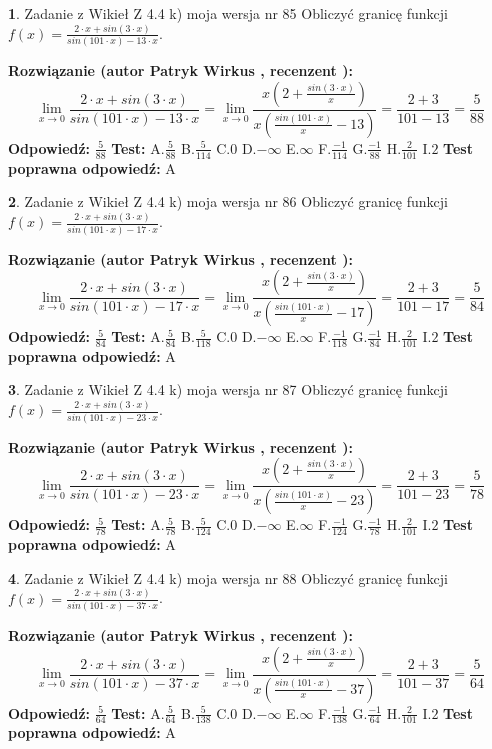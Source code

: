 \documentclass[12pt, a4paper]{article}
\theoremstyle{definition} %
\newtheorem{zad}{}
\newcommand{\zadStart}[1]{\begin{zad}#1\newline}
\newcommand{\zadStop}{\end{zad}}
\newcommand{\rozwStart}[2]{\noindent \textbf{Rozwiązanie (autor #1 , recenzent #2): }\newline}
\newcommand{\rozwStop}{\newline}
\newcommand{\odpStart}{\noindent \textbf{Odpowiedź:}\newline}
\newcommand{\odpStop}{\newline}
\newcommand{\testStart}{\noindent \textbf{Test:}\newline}
\newcommand{\testStop}{\newline}
\newcommand{\kluczStart}{\noindent \textbf{Test poprawna odpowiedź:}\newline}
\newcommand{\kluczStop}{\newline}
\begin{document}
\zadStart{Zadanie z Wikieł Z 4.4 k) moja wersja nr 85}
Obliczyć granicę funkcji $f(x)=\frac{2\cdot x +sin(3\cdot x)}{sin(101\cdot x) -13\cdot x}$.
\zadStop
\rozwStart{Patryk Wirkus}{}
$$\lim\limits_{x\to 0}\frac{2\cdot x +sin(3\cdot x)}{sin(101\cdot x) -13\cdot x}
=\lim\limits_{x\to 0}\frac{x(2+\frac{sin(3\cdot x)}{x})}{x(\frac{sin(101\cdot x)}{x}-13)}
=\frac{2+3}{101-13} = \frac{5}{88}$$
\rozwStop
\odpStart
$\frac{5}{88}$
\odpStop
\testStart
A.$\frac{5}{88}$
B.$\frac{5}{114}$
C.$0$
D.$-\infty$
E.$\infty$
F.$\frac{-1}{114}$
G.$\frac{-1}{88}$
H.$\frac{2}{101}$
I.$2$
\testStop
\kluczStart
A
\kluczStop



\zadStart{Zadanie z Wikieł Z 4.4 k) moja wersja nr 86}
Obliczyć granicę funkcji $f(x)=\frac{2\cdot x +sin(3\cdot x)}{sin(101\cdot x) -17\cdot x}$.
\zadStop
\rozwStart{Patryk Wirkus}{}
$$\lim\limits_{x\to 0}\frac{2\cdot x +sin(3\cdot x)}{sin(101\cdot x) -17\cdot x}
=\lim\limits_{x\to 0}\frac{x(2+\frac{sin(3\cdot x)}{x})}{x(\frac{sin(101\cdot x)}{x}-17)}
=\frac{2+3}{101-17} = \frac{5}{84}$$
\rozwStop
\odpStart
$\frac{5}{84}$
\odpStop
\testStart
A.$\frac{5}{84}$
B.$\frac{5}{118}$
C.$0$
D.$-\infty$
E.$\infty$
F.$\frac{-1}{118}$
G.$\frac{-1}{84}$
H.$\frac{2}{101}$
I.$2$
\testStop
\kluczStart
A
\kluczStop



\zadStart{Zadanie z Wikieł Z 4.4 k) moja wersja nr 87}
Obliczyć granicę funkcji $f(x)=\frac{2\cdot x +sin(3\cdot x)}{sin(101\cdot x) -23\cdot x}$.
\zadStop
\rozwStart{Patryk Wirkus}{}
$$\lim\limits_{x\to 0}\frac{2\cdot x +sin(3\cdot x)}{sin(101\cdot x) -23\cdot x}
=\lim\limits_{x\to 0}\frac{x(2+\frac{sin(3\cdot x)}{x})}{x(\frac{sin(101\cdot x)}{x}-23)}
=\frac{2+3}{101-23} = \frac{5}{78}$$
\rozwStop
\odpStart
$\frac{5}{78}$
\odpStop
\testStart
A.$\frac{5}{78}$
B.$\frac{5}{124}$
C.$0$
D.$-\infty$
E.$\infty$
F.$\frac{-1}{124}$
G.$\frac{-1}{78}$
H.$\frac{2}{101}$
I.$2$
\testStop
\kluczStart
A
\kluczStop



\zadStart{Zadanie z Wikieł Z 4.4 k) moja wersja nr 88}
Obliczyć granicę funkcji $f(x)=\frac{2\cdot x +sin(3\cdot x)}{sin(101\cdot x) -37\cdot x}$.
\zadStop
\rozwStart{Patryk Wirkus}{}
$$\lim\limits_{x\to 0}\frac{2\cdot x +sin(3\cdot x)}{sin(101\cdot x) -37\cdot x}
=\lim\limits_{x\to 0}\frac{x(2+\frac{sin(3\cdot x)}{x})}{x(\frac{sin(101\cdot x)}{x}-37)}
=\frac{2+3}{101-37} = \frac{5}{64}$$
\rozwStop
\odpStart
$\frac{5}{64}$
\odpStop
\testStart
A.$\frac{5}{64}$
B.$\frac{5}{138}$
C.$0$
D.$-\infty$
E.$\infty$
F.$\frac{-1}{138}$
G.$\frac{-1}{64}$
H.$\frac{2}{101}$
I.$2$
\testStop
\kluczStart
A
\kluczStop
\end{document}
